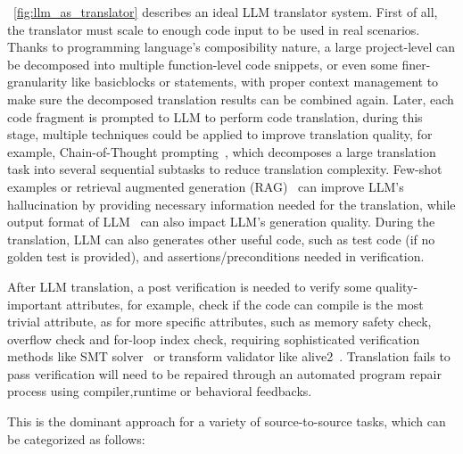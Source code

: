 \documentclass[pdflatex,sn-mathphys-ay,twocolumn, a4paper]{sn-jnl}%
\theoremstyle{thmstyleone}%
\theoremstyle{thmstyletwo}%
\theoremstyle{thmstylethree}%
\begin{document}
~\autoref{fig:llm_as_translator} describes an ideal LLM translator system. First of all, the translator must scale to enough code input to be used in real scenarios. Thanks to programming language's composibility nature, a large project-level can be decomposed into multiple function-level code snippets, or even some finer-granularity like basicblocks or statements, with proper context management to make sure the decomposed translation results can be combined again. Later, each code fragment is prompted to LLM to perform code translation, during this stage, multiple techniques could be applied to improve translation quality, for example, Chain-of-Thought prompting~\citep{cot_2022_neurips}, which decomposes a large translation task into several sequential subtasks to reduce translation complexity. Few-shot examples or retrieval augmented generation (RAG)~\citep{rag_2020_neurips} can improve LLM's hallucination by providing necessary information needed for the translation, while output format of LLM~\citep{95_macedo2024exploring} can also impact LLM's generation quality. During the translation, LLM can also generates other useful code, such as test code (if no golden test is provided), and assertions/preconditions needed in verification.

After LLM translation, a post verification is needed to verify some quality-important attributes, for example, check if the code can compile is the most trivial attribute, as for more specific attributes, such as memory safety check, overflow check and for-loop index check, requiring sophisticated verification methods like SMT solver~\citep{z3smt_2008} or transform validator like alive2~\citep{alive2_2021_pldi}. Translation fails to pass verification will need to be repaired through an automated program repair process using compiler,runtime or behavioral feedbacks.


This is the dominant approach for a variety of source-to-source tasks, which can be categorized as follows:
\end{document}
